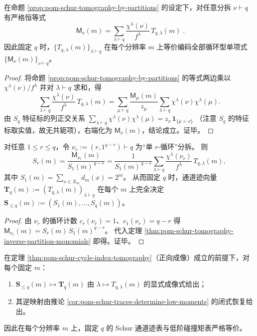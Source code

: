 \begin{theorem}\label{thm:pom-schur-tomography-inverse-partition-monomials}
在命题 \ref{prop:pom-schur-tomography-by-partitions} 的设定下，对任意分拆 \(\nu\vdash q\) 有严格恒等式
\[
\boxed{\;
\mathsf{M}_\nu(m)
=\sum_{\lambda\vdash q}\frac{\chi^\lambda(\nu)}{f^\lambda}\,T_{q,\lambda}(m)\; }.
\]
因此固定 \(q\) 时，\(\{T_{q,\lambda}(m)\}_{\lambda\vdash q}\) 在每个分辨率 \(m\) 上等价编码全部循环型单项式 \(\{\mathsf{M}_\nu(m)\}_{\nu\vdash q}\)。
\end{theorem}
\begin{proof}
将命题 \ref{prop:pom-schur-tomography-by-partitions} 的等式两边乘以 \(\chi^\lambda(\nu)/f^\lambda\) 并对 \(\lambda\vdash q\) 求和，得
\[
\sum_{\lambda\vdash q}\frac{\chi^\lambda(\nu)}{f^\lambda}\,T_{q,\lambda}(m)
=\sum_{\mu\vdash q}\frac{\mathsf{M}_\mu(m)}{z_\mu}\sum_{\lambda\vdash q}\chi^\lambda(\nu)\chi^\lambda(\mu).
\]
由 \(S_q\) 特征标的列正交关系
\(
\sum_{\lambda\vdash q}\chi^\lambda(\nu)\chi^\lambda(\mu)=z_\nu\,\mathbf 1_{\{\mu=\nu\}}
\)
（注意 \(S_q\) 的特征标取实值，故无共轭项），右端化为 \(\mathsf{M}_\nu(m)\)，结论成立。证毕。
\end{proof}

\begin{corollary}\label{cor:pom-schur-traces-determine-low-moments}
对任意 \(1\le r\le q\)，令 \(\nu_r:=(r,1^{q-r})\vdash q\) 为“单 \(r\)-循环”分拆。
则
\[
S_r(m)
=\frac{\mathsf{M}_{\nu_r}(m)}{S_1(m)^{\,q-r}}
=\frac{1}{S_1(m)^{\,q-r}}
\sum_{\lambda\vdash q}\frac{\chi^\lambda(\nu_r)}{f^\lambda}\,T_{q,\lambda}(m),
\]
其中 \(S_1(m)=\sum_{x\in X_m}d_m(x)=2^m\)。
从而固定 \(q\) 时，通道迹向量 \(\mathbf T_q(m):=(T_{q,\lambda}(m))_{\lambda\vdash q}\) 在每个 \(m\) 上完全决定 \(\mathbf S_{\le q}(m):=(S_1(m),\dots,S_q(m))\)。
\end{corollary}
\begin{proof}
由 \(\nu_r\) 的循环计数 \(c_r(\nu_r)=1\)、\(c_1(\nu_r)=q-r\) 得
\(
\mathsf{M}_{\nu_r}(m)=S_r(m)\,S_1(m)^{q-r}
\)。
代入定理 \ref{thm:pom-schur-tomography-inverse-partition-monomials} 即得。证毕。
\end{proof}

\begin{corollary}\label{cor:pom-schur-traces-moments-bijection}
在定理 \ref{thm:pom-schur-cycle-index-tomography}（正向成像）成立的前提下，对每个固定 \(m\)：
\begin{enumerate}
  \item \(\mathbf S_{\le q}(m)\mapsto \mathbf T_q(m)\) 由 \(\lambda\mapsto T_{q,\lambda}(m)\) 的显式成像式给出；
  \item 其逆映射由推论 \ref{cor:pom-schur-traces-determine-low-moments} 的闭式恢复给出。
\end{enumerate}
因此在每个分辨率 \(m\) 上，固定 \(q\) 的 Schur 通道迹表与低阶碰撞矩表严格等价。
\end{corollary}

